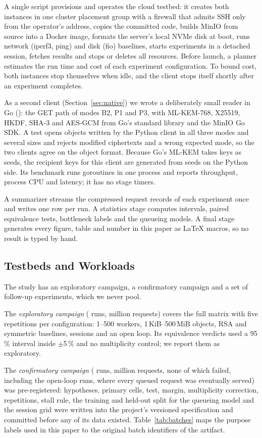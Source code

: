 \documentclass[conference]{IEEEtran}
\begin{document}
A single script provisions and operates the cloud testbed: it creates both instances in one
cluster placement group with a firewall that admits SSH only from the operator's address, copies
the committed code, builds MinIO from source into a Docker image, formats the server's local NVMe
disk at boot, runs network (iperf3, ping) and disk (fio) baselines, starts experiments in a
detached session, fetches results and stops or deletes all resources. Before launch, a planner
estimates the run time and cost of each experiment configuration. To bound cost, both instances
stop themselves when idle, and the client stops itself shortly after an experiment completes.

As a second client (Section~\ref{sec:native}) we wrote a deliberately small reader in
Go (\AudNGo): the GET path of modes B2, P1 and P3, with ML-KEM-768, X25519, HKDF, SHA-3 and
AES-GCM from Go's standard library and the MinIO Go SDK. A test opens objects written by the
Python client in all three modes and several sizes and rejects modified ciphertexts and a wrong
expected mode, so the two clients agree on the object format. Because Go's ML-KEM takes keys
as seeds, the recipient keys for this client are generated from seeds on the Python side. Its
benchmark runs goroutines in one process and reports throughput, process CPU and latency; it
has no stage timers.

A summarizer streams the compressed request records of each experiment once and writes one row
per run. A statistics stage computes intervals, paired equivalence tests, bottleneck labels and
the queueing models. A final stage generates every figure, table and number in this paper as
\LaTeX{} macros, so no result is typed by hand.

\subsection{Testbeds and Workloads}\label{sec:campaigns}
The study has an exploratory campaign, a confirmatory campaign and a set of follow-up
experiments, which we never pool.

The \emph{exploratory campaign} (\TotalRuns{} runs, \TotalRequestsM{} million
requests) covers the full matrix with five repetitions per configuration: 1--500 workers,
1\,KiB--500\,MiB objects, RSA and symmetric baselines, sessions and an open loop. Its equivalence
verdicts used a 95\,\% interval inside $\pm$5\,\% and no multiplicity control; we report them as
exploratory.

The \emph{confirmatory campaign} (\RevAllRuns{} runs, \RevAllRequests{} million
requests, none of which failed, including the \RevOpenRuns{} open-loop runs, where every queued
request was eventually served) was pre-registered: hypotheses, primary cells, test, margin,
multiplicity correction, repetitions, stall rule, the training and held-out split for the
queueing model and the session grid were written into the project's versioned specification and
committed before any of its data existed. Table~\ref{tab:batches} maps the purpose labels used
in this paper to the original batch identifiers of the artifact.
\end{document}
